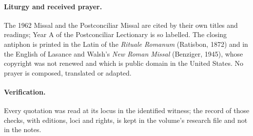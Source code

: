 \paragraph{Liturgy and received prayer.} The 1962 Missal and the Postconciliar Missal are cited by their own titles and readings; Year A of the Postconciliar Lectionary is so labelled. The closing antiphon is printed in the Latin of the \emph{Rituale Romanum} (Ratisbon, 1872) and in the English of Lasance and Walsh's \emph{New Roman Missal} (Benziger, 1945), whose copyright was not renewed and which is public domain in the United States. No prayer is composed, translated or adapted.

\paragraph{Verification.} Every quotation was read at its locus in the identified witness; the record of those checks, with editions, loci and rights, is kept in the volume's research file and not in the notes.
